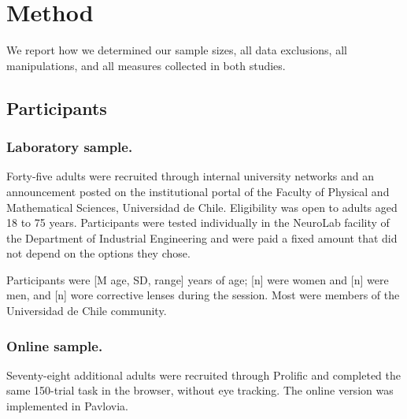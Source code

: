 \documentclass[man,natbib,floatsintext]{apa7}
\begin{document}
\section{Method}

We report how we determined our sample sizes, all data exclusions, all manipulations, and all measures collected in both studies.

\subsection{Participants}

\subsubsection{Laboratory sample.} Forty-five adults were recruited through internal university networks and an announcement posted on the institutional portal of the Faculty of Physical and Mathematical Sciences, Universidad de Chile. Eligibility was open to adults aged 18 to 75 years. Participants were tested individually in the NeuroLab facility of the Department of Industrial Engineering and were paid a fixed amount that did not depend on the options they chose.

Participants were [M age, SD, range] years of age; [n] were women and [n] were men, and [n] wore corrective lenses during the session. Most were members of the Universidad de Chile community.

\subsubsection{Online sample.} Seventy-eight additional adults were recruited through Prolific and completed the same 150-trial task in the browser, without eye tracking. The online version was implemented in Pavlovia. %
\end{document}
